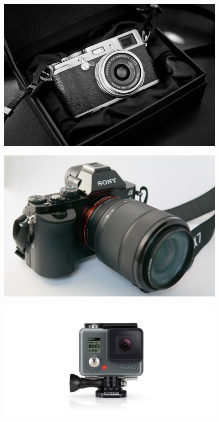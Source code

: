 \documentclass{beamer}
\begin{document}
	\begin{frame}
		\begin{figure}
			\centering
			\includegraphics[scale=0.4]{141.jpg}
		\end{figure}
	\end{frame}
	\begin{frame}
		\begin{figure}
			\centering
			\includegraphics[scale=0.4]{142.jpg}
		\end{figure}
	\end{frame}
	\begin{frame}
		\begin{figure}
			\centering
			\includegraphics[scale=0.4]{143.jpg}
		\end{figure}
	\end{frame}
\end{document}
